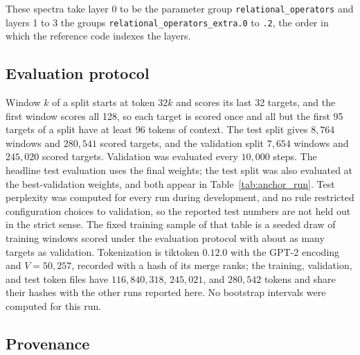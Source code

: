 \documentclass[twoside,11pt]{article}
\begin{document}
These spectra take layer 0 to be the parameter group \texttt{relational\_\allowbreak operators} and layers 1 to 3 the groups \texttt{relational\_\allowbreak operators\_\allowbreak extra.0} to \texttt{.2}, the order in which the reference code indexes the layers.


\subsection{Evaluation protocol}
\label{app:run_evaluation}

Window $k$ of a split starts at token $32k$ and scores its last 32 targets, and the first window scores all 128, so each target is scored once and all but the first 95 targets of a split have at least 96 tokens of context. The test split gives $8{,}764$ windows and $280{,}541$ scored targets, and the validation split $7{,}654$ windows and $245{,}020$ scored targets. %
Validation was evaluated every $10{,}000$ steps. %
The headline test evaluation uses the final weights; the test split was also evaluated at the best-validation weights, and both appear in Table~\ref{tab:anchor_run}. Test perplexity was computed for every run during development, and no rule restricted configuration choices to validation, so the reported test numbers are not held out in the strict sense. %
The fixed training sample of that table is a seeded draw of training windows scored under the evaluation protocol with about as many targets as validation. %
Tokenization is tiktoken $0.12.0$ with the GPT-2 encoding and $V=50{,}257$, recorded with a hash of its merge ranks; the training, validation, and test token files have $116{,}840{,}318$, $245{,}021$, and $280{,}542$ tokens and share their hashes with the other runs reported here. %
No bootstrap intervals were computed for this run.

\subsection{Provenance}
\label{app:run_provenance}
\end{document}
